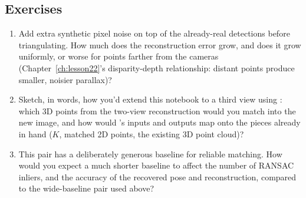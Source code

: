 \subsection*{Exercises}
\begin{enumerate}
  \item Add extra synthetic pixel noise on top of the already-real detections before triangulating. How much does the reconstruction error grow, and does it grow uniformly, or worse for points farther from the cameras (Chapter~\ref{ch:lesson22}'s disparity-depth relationship: distant points produce smaller, noisier parallax)?
  \item Sketch, in words, how you'd extend this notebook to a third view using : which 3D points from the two-view reconstruction would you match into the new image, and how would 's inputs and outputs map onto the pieces already in hand ($K$, matched 2D points, the existing 3D point cloud)?
  \item This pair has a deliberately generous baseline for reliable matching. How would you expect a much shorter baseline to affect the number of RANSAC inliers, and the accuracy of the recovered pose and reconstruction, compared to the wide-baseline pair used above?
\end{enumerate}

\vfill
{}
